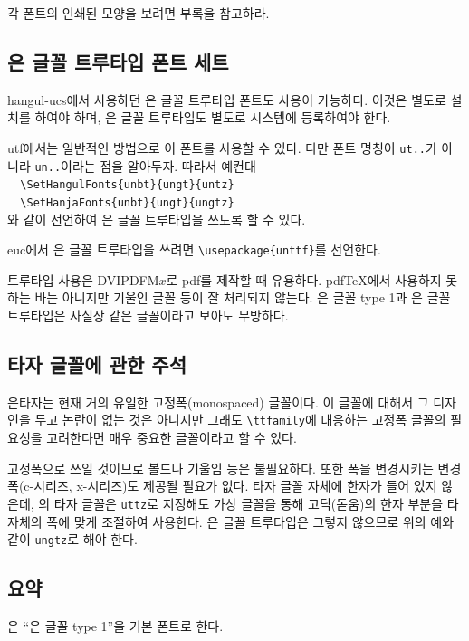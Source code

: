 각 폰트의 인쇄된 모양을 보려면 부록을 참고하라.

\subsection{은 글꼴 트루타입 폰트 세트}

hangul-ucs에서 사용하던 은 글꼴 트루타입 폰트도 사용이 가능하다.
이것은 별도로 설치를 하여야 하며, 은 글꼴 트루타입도 별도로
시스템에 등록하여야 한다.

\utf utf에서는 일반적인 방법으로 이 폰트를 사용할 수 있다. 다만
폰트 명칭이 \texttt{ut..}가 아니라 \texttt{un..}이라는 점을 알아두자.
따라서 예컨대 \\
\verb|  \SetHangulFonts{unbt}{ungt}{untz}|\\
\verb|  \SetHanjaFonts{unbt}{ungt}{ungtz}|\\
와 같이 선언하여 은 글꼴 트루타입을 쓰도록 할 수 있다.

\euc euc에서 은 글꼴 트루타입을 쓰려면 \verb|\usepackage{unttf}|를
선언한다.

트루타입 사용은 DVIPDFM$x$로 pdf를 제작할 때 유용하다. pdf\TeX 에서
사용하지 못하는 바는 아니지만 기울인 글꼴 등이 잘 처리되지 않는다. 
은 글꼴 type 1과 은 글꼴 트루타입은 사실상 같은 글꼴이라고 보아도 무방하다.

\subsection{타자 글꼴에 관한 주석}

은타자는 현재 거의 유일한 고정폭(monospaced) 글꼴이다. 이 글꼴에
대해서 그 디자인을 두고 논란이 없는 것은 아니지만 그래도 \verb|\ttfamily|에
대응하는 고정폭 글꼴의 필요성을 고려한다면 매우 중요한 글꼴이라고 할 수 있다.

고정폭으로 쓰일 것이므로 볼드나 기울임 등은 불필요하다. 또한 폭을 변경시키는
변경폭(c-시리즈, x-시리즈)도 제공될 필요가 없다. 타자 글꼴 자체에 한자가
들어 있지 않은데, \kotex 의 타자 글꼴은 \texttt{uttz}로 지정해도
가상 글꼴을 통해 고딕(돋움)의 한자 부분을 타자체의 폭에 맞게 조절하여
사용한다. 은 글꼴 트루타입은 그렇지 않으므로 위의 예와 같이 \texttt{ungtz}로
해야 한다.

\subsection{요약}

\kotex 은 ``은 글꼴 type 1''을 기본 폰트로 한다.

